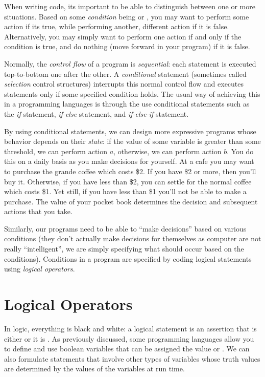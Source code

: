 

When writing code, its important to be able to distinguish between one or more situations.  
Based on some \emph{condition} being \True or \False, you may want to perform some action
if its true, while performing another, different action if it is false.  Alternatively, you may simply
want to perform one action if and only if the condition is true, and do nothing (move forward
in your program) if it is false.

Normally, the \emph{control flow} of a program is \emph{sequential}: each statement is executed
top-to-bottom one after the other.  A \emph{conditional} statement (sometimes called \emph{selection} 
control structures) interrupts this normal control
flow and executes statements only if some specified condition holds.  The usual way of achieving
this in a programming languages is through the use conditional statements such as the \emph{if}
statement, \emph{if-else} statement, and \emph{if-else-if} statement.

By using conditional statements, we can design more expressive programs whose behavior 
depends on their \emph{state}: if the value of some variable is greater than some threshold, we
can perform action $a$, otherwise, we can perform action $b$.  You do this on a daily basis
as you make decisions for yourself.  At a cafe you may want to purchase the grande coffee which
costs \$2.  If you have \$2 or more, then you'll buy it.  Otherwise, if you have less than \$2, you 
can settle for the normal coffee which costs \$1.  Yet still, if you have less than \$1 you'll not be
able to make a purchase.  The value of your pocket book determines the decision and subsequent
actions that you take.

Similarly, our programs need to be able to ``make decisions'' based on various conditions 
(they don't actually make decisions for themselves as computer are not really ``intelligent'', 
we are simply specifying what should occur based on the conditions).  Conditions in a program
are specified by coding logical statements using \emph{logical operators}.

\section{Logical Operators}

In logic, everything is black and white: a logical statement is an assertion that is 
either \True or it is \False.  As previously discussed, some programming languages
allow you to define and use boolean variables that can be assigned the value \True
or \False.  We can also formulate statements that involve other types of variables 
whose truth values are determined by the values of the variables at run time.

